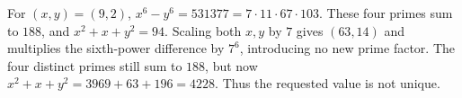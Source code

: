 For $(x,y)=(9,2)$, $x^6-y^6=531377=7\cdot11\cdot67\cdot103$. These four primes sum to $188$, and $x^2+x+y^2=94$. Scaling both $x,y$ by $7$ gives $(63,14)$ and multiplies the sixth-power difference by $7^6$, introducing no new prime factor. The four distinct primes still sum to $188$, but now $x^2+x+y^2=3969+63+196=4228$. Thus the requested value is not unique.
